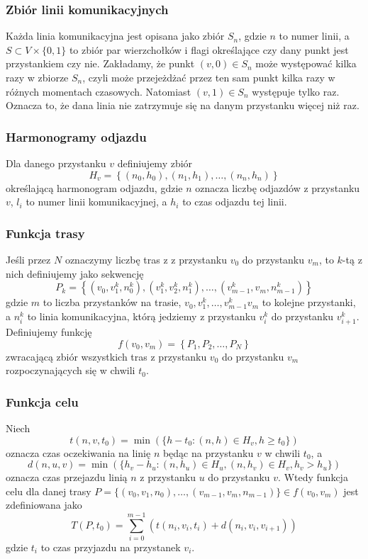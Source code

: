 \documentclass{article}
\begin{document}
\subsubsection{Zbiór linii komunikacyjnych}\label{subsec:lines}
Każda linia komunikacyjna jest opisana jako zbiór \(S_n\),
gdzie \(n\) to numer linii, a \(S \subset V\times\{0, 1\}\) to zbiór par wierzchołków i flagi określające czy dany punkt jest przystankiem czy nie.
Zakładamy, że punkt \((v, 0)\in S_n\) może występować kilka razy w zbiorze \(S_n\), czyli
może przejeżdżać przez ten sam punkt kilka razy w różnych momentach czasowych. Natomiast \((v, 1)\in S_n\) występuje tylko raz.
Oznacza to, że dana linia nie zatrzymuje się na danym przystanku więcej niż raz.

\subsubsection{Harmonogramy odjazdu}
Dla danego przystanku \(v\) definiujemy zbiór \[H_v = \left\{(n_0, h_0), (n_1, h_1), \dots, (n_n, h_n)\right\}\]
określającą harmonogram odjazdu, gdzie \(n\) oznacza liczbę odjazdów z przystanku \(v\),
\(l_i\) to numer linii komunikacyjnej, a \(h_i\) to czas odjazdu tej linii.

\subsubsection{Funkcja trasy}
Jeśli przez \(N\) oznaczymy liczbę tras z z przystanku \(v_0\) do przystanku \(v_m\), to \(k\)-tą z nich definiujemy jako sekwencję
\[P_k = \left\{(v_0, v_1^k, n_0^k), (v_1^k, v_2^k, n_1^k), \ldots, (v_{m - 1}^k, v_{m}, n_{m - 1}^k)\right\}\]
gdzie \(m\) to liczba przystanków na trasie, \(v_0, v_1^k, \dots, v_{m - 1}^k v_m\) to kolejne przystanki, a \(n_i^k\) to linia komunikacyjna, którą jedziemy z przystanku \(v_i^k\) do przystanku \(v_{i + 1}^k\).
Definiujemy funkcję
\[f(v_0, v_m) = \left\{P_1, P_2, \dots, P_N\right\}\]
zwracającą zbiór wszystkich tras z przystanku \(v_0\) do przystanku \(v_m\) rozpoczynających się w chwili \(t_0\).

\subsubsection{Funkcja celu}
Niech \[t(n, v, t_0) = \min(\{h - t_0 : (n, h)\in H_v, h \geq t_0\})\] oznacza czas oczekiwania na linię \(n\) będąc na przystanku \(v\)
w chwili \(t_0\), a \[d(n, u, v) = \min(\{h_v - h_u : (n, h_u)\in H_u, (n, h_v)\in H_v, h_v > h_u\})\] oznacza czas przejazdu linią \(n\) z przystanku \(u\) do przystanku \(v\). Wtedy funkcja celu
dla danej trasy \(P = \{(v_0, v_1, n_0),\dots,(v_{m - 1}, v_m, n_{m - 1})\}\in f(v_0, v_m)\) jest zdefiniowana jako
\[
    T(P, t_0) = \sum_{i = 0}^{m - 1}\left(t(n_i, v_i, t_i) + d(n_i, v_i, v_{i + 1})\right)
\]
gdzie \(t_i\) to czas przyjazdu na przystanek \(v_i\).
\end{document}
